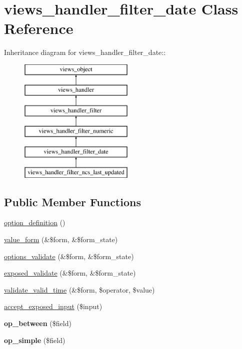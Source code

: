 \hypertarget{classviews__handler__filter__date}{
\section{views\_\-handler\_\-filter\_\-date Class Reference}
\label{classviews__handler__filter__date}
}
Inheritance diagram for views\_\-handler\_\-filter\_\-date::\begin{figure}[H]
\begin{center}
\leavevmode
\includegraphics[height=6cm]{classviews__handler__filter__date}
\end{center}
\end{figure}
\subsection*{Public Member Functions}
\begin{CompactItemize}
\item 
\hyperlink{classviews__handler__filter__date_5fdeb678009a8c8c23395826caee3062}{option\_\-definition} ()
\item 
\hyperlink{classviews__handler__filter__date_5c7fb298feef092a2cb3bc3f75f54f29}{value\_\-form} (\&\$form, \&\$form\_\-state)
\item 
\hyperlink{classviews__handler__filter__date_6d4e05f04a0f9ea5663f165777f54003}{options\_\-validate} (\&\$form, \&\$form\_\-state)
\item 
\hyperlink{classviews__handler__filter__date_0146f5fd6dee328506fc6f29006eb401}{exposed\_\-validate} (\&\$form, \&\$form\_\-state)
\item 
\hyperlink{classviews__handler__filter__date_d19ed65f3335ed1ac6896fe17a480b4e}{validate\_\-valid\_\-time} (\&\$form, \$operator, \$value)
\item 
\hyperlink{classviews__handler__filter__date_063da758bf1832f38454620cbc94e304}{accept\_\-exposed\_\-input} (\$input)
\item 
\hypertarget{classviews__handler__filter__date_b097983da22dfe68e579d92147189a9c}{
\textbf{op\_\-between} (\$field)}
\label{classviews__handler__filter__date_b097983da22dfe68e579d92147189a9c}

\item 
\hypertarget{classviews__handler__filter__date_3da46dbfd7a36f8b8ac327de68674c71}{
\textbf{op\_\-simple} (\$field)}
\label{classviews__handler__filter__date_3da46dbfd7a36f8b8ac327de68674c71}

\end{CompactItemize}



